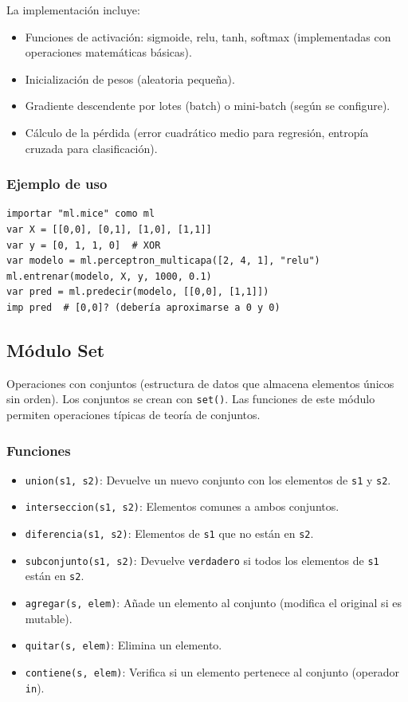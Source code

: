 \documentclass[12pt]{article}
\begin{document}
La implementación incluye:
\begin{itemize}
    \item Funciones de activación: sigmoide, relu, tanh, softmax (implementadas con operaciones matemáticas básicas).
    \item Inicialización de pesos (aleatoria pequeña).
    \item Gradiente descendente por lotes (batch) o mini-batch (según se configure).
    \item Cálculo de la pérdida (error cuadrático medio para regresión, entropía cruzada para clasificación).
\end{itemize}

\subsubsection*{Ejemplo de uso}
\begin{lstlisting}
importar "ml.mice" como ml
var X = [[0,0], [0,1], [1,0], [1,1]]
var y = [0, 1, 1, 0]  # XOR
var modelo = ml.perceptron_multicapa([2, 4, 1], "relu")
ml.entrenar(modelo, X, y, 1000, 0.1)
var pred = ml.predecir(modelo, [[0,0], [1,1]])
imp pred  # [0,0]? (debería aproximarse a 0 y 0)
\end{lstlisting}

\subsection{Módulo Set}

Operaciones con conjuntos (estructura de datos que almacena elementos únicos sin orden). Los conjuntos se crean con \texttt{set()}. Las funciones de este módulo permiten operaciones típicas de teoría de conjuntos.

\subsubsection*{Funciones}
\begin{itemize}
    \item \texttt{union(s1, s2)}: Devuelve un nuevo conjunto con los elementos de \texttt{s1} y \texttt{s2}.
    \item \texttt{interseccion(s1, s2)}: Elementos comunes a ambos conjuntos.
    \item \texttt{diferencia(s1, s2)}: Elementos de \texttt{s1} que no están en \texttt{s2}.
    \item \texttt{subconjunto(s1, s2)}: Devuelve \texttt{verdadero} si todos los elementos de \texttt{s1} están en \texttt{s2}.
    \item \texttt{agregar(s, elem)}: Añade un elemento al conjunto (modifica el original si es mutable).
    \item \texttt{quitar(s, elem)}: Elimina un elemento.
    \item \texttt{contiene(s, elem)}: Verifica si un elemento pertenece al conjunto (operador \texttt{in}).
\end{itemize}
\end{document}
